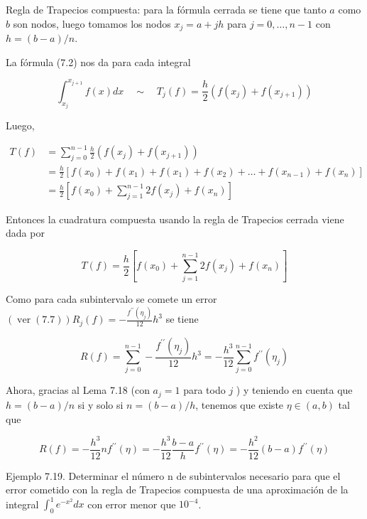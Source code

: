 \documentclass[10pt]{book}
\begin{document}
Regla de Trapecios compuesta: para la fórmula cerrada se tiene que tanto $a$ como $b$ son nodos, luego tomamos los nodos $x_{j}=a+j h$ para $j=0, \ldots, n-1$ con $h=(b-a) / n$.

La fórmula (7.2) nos da para cada integral

$$
\int_{x_{j}}^{x_{j+1}} f(x) d x \quad \sim \quad T_{j}(f)=\frac{h}{2}\left(f\left(x_{j}\right)+f\left(x_{j+1}\right)\right)
$$

Luego,

$$
\begin{aligned}
T(f) & =\sum_{j=0}^{n-1} \frac{h}{2}\left(f\left(x_{j}\right)+f\left(x_{j+1}\right)\right) \\
& =\frac{h}{2}\left[f\left(x_{0}\right)+f\left(x_{1}\right)+f\left(x_{1}\right)+f\left(x_{2}\right)+\ldots+f\left(x_{n-1}\right)+f\left(x_{n}\right)\right] \\
& =\frac{h}{2}\left[f\left(x_{0}\right)+\sum_{j=1}^{n-1} 2 f\left(x_{j}\right)+f\left(x_{n}\right)\right]
\end{aligned}
$$

Entonces la cuadratura compuesta usando la regla de Trapecios cerrada viene dada por


\begin{equation*}
T(f)=\frac{h}{2}\left[f\left(x_{0}\right)+\sum_{j=1}^{n-1} 2 f\left(x_{j}\right)+f\left(x_{n}\right)\right] \tag{7.10}
\end{equation*}


Como para cada subintervalo se comete un error $(\operatorname{ver}(7.7)) R_{j}(f)=-\frac{f^{\prime \prime}\left(\eta_{j}\right)}{12} h^{3}$ se tiene

$$
R(f)=\sum_{j=0}^{n-1}-\frac{f^{\prime \prime}\left(\eta_{j}\right)}{12} h^{3}=-\frac{h^{3}}{12} \sum_{j=0}^{n-1} f^{\prime \prime}\left(\eta_{j}\right)
$$

Ahora, gracias al Lema 7.18 (con $a_{j}=1$ para todo $j$ ) y teniendo en cuenta que $h=(b-a) / n$ si y solo si $n=(b-a) / h$, tenemos que existe $\eta \in(a, b)$ tal que


\begin{equation*}
R(f)=-\frac{h^{3}}{12} n f^{\prime \prime}(\eta)=-\frac{h^{3}}{12} \frac{b-a}{h} f^{\prime \prime}(\eta)=-\frac{h^{2}}{12}(b-a) f^{\prime \prime}(\eta) \tag{7.11}
\end{equation*}


Ejemplo 7.19. Determinar el número n de subintervalos necesario para que el error cometido con la regla de Trapecios compuesta de una aproximación de la integral $\int_{0}^{1} e^{-x^{2}} d x$ con error menor que $10^{-4}$.
\end{document}
